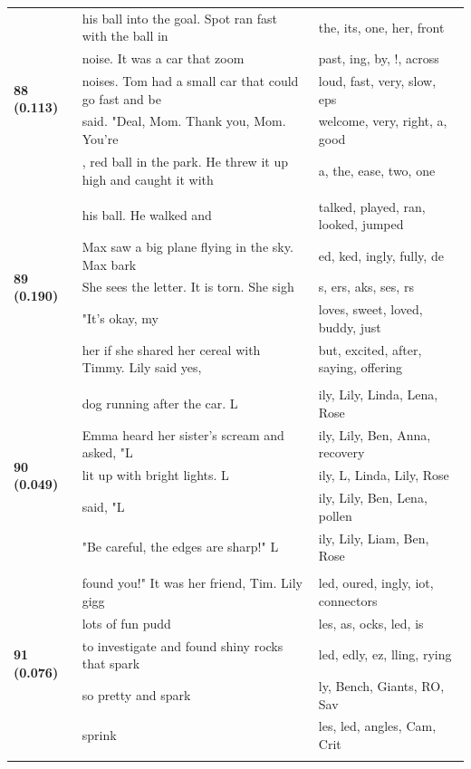 \documentclass{article}
\theoremstyle{plain}
\theoremstyle{definition}
\theoremstyle{remark}
\begin{document}
\begin{longtable}{|p{}|p{}|p{}|}
\multirow{5}{*}{\textbf{88 (0.113)}} & his ball into the goal.  Spot ran fast with the ball in & the,  its,  one,  her,  front \\
& noise. It was a car that zoom & past, ing,  by, !,  across \\
& noises. Tom had a small car that could go fast and be & loud,  fast,  very,  slow, eps \\
& said.  "Deal, Mom. Thank you, Mom. You're & welcome,  very,  right,  a,  good \\
& , red ball in the park. He threw it up high and caught it with & a,  the,  ease,  two,  one \\
& & \\
\multirow{5}{*}{\textbf{89 (0.190)}} & his ball. He walked and & talked,  played,  ran,  looked,  jumped \\
& Max saw a big plane flying in the sky.  Max bark & ed, ked, ingly, fully, de \\
& She sees the letter. It is torn. She sigh & s, ers, aks, ses, rs \\
& "It's okay, my & loves,  sweet,  loved,  buddy,  just \\
& her if she shared her cereal with Timmy. Lily said yes, & but,  excited,  after,  saying,  offering \\
& & \\
\multirow{5}{*}{\textbf{90 (0.049)}} & dog running after the car.   L & ily,  Lily,  Linda,  Lena,  Rose \\
& Emma heard her sister's scream and asked, "L & ily,  Lily,  Ben,  Anna,  recovery \\
& lit up with bright lights.   L & ily, L,  Linda,  Lily,  Rose \\
& said, "L & ily,  Lily,  Ben,  Lena,  pollen \\
& "Be careful, the edges are sharp!"   L & ily,  Lily,  Liam,  Ben,  Rose \\
& & \\
\multirow{5}{*}{\textbf{91 (0.076)}} & found you!" It was her friend, Tim.   Lily gigg & led, oured, ingly, iot,  connectors \\
& lots of fun pudd & les, as, ocks, led, is \\
& to investigate and found shiny rocks that spark & led, edly, ez, lling, rying \\
& so pretty and spark & ly,  Bench,  Giants,  RO, Sav \\
& sprink & les, led, angles, Cam,  Crit \\
& & \\

\end{longtable}
\end{document}
